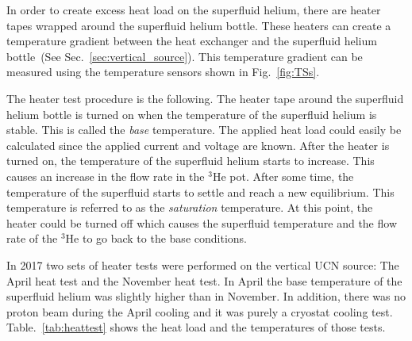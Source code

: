 In order to create excess heat load on the superfluid helium, there
are heater tapes wrapped around the superfluid helium bottle. These
heaters can create a temperature gradient between the heat exchanger
and the superfluid helium bottle~(See
Sec.~\ref{sec:vertical_source}). This temperature gradient can be
measured using the temperature sensors shown in Fig.~\ref{fig:TSs}.

The heater test procedure is the following. The heater tape around the
superfluid helium bottle is turned on when the temperature of the
superfluid helium is stable. This is called the {\it{base}}
temperature. The applied heat load could easily be calculated since
the applied current and voltage are known. After the heater is turned
on, the temperature of the superfluid helium starts to increase. This
causes an increase in the flow rate in the $^3$He pot. After some time,
the temperature of the superfluid starts to settle and reach a new
equilibrium. This temperature is referred to as the
{\it{saturation}} temperature. At this point, the heater could be
turned off which causes the superfluid temperature and the flow rate
of the $^3$He to go back to the base conditions.

In 2017 two sets of heater tests were performed on the vertical UCN
source: The April heat test and the November heat test. In April the
base temperature of the superfluid helium was slightly higher than in
November. In addition, there was no proton beam during the April
cooling and it was purely a cryostat cooling
test. Table.~\ref{tab:heattest} shows the heat load and the
temperatures of those tests.

